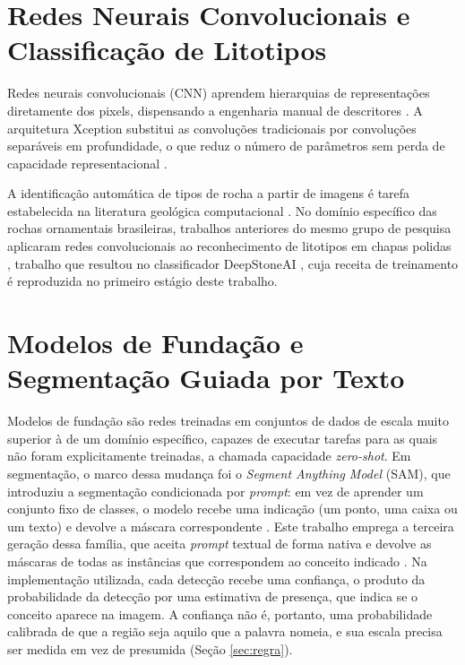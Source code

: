 \section{Redes Neurais Convolucionais e Classificação de Litotipos}

Redes neurais convolucionais (CNN) aprendem hierarquias de representações diretamente dos pixels, dispensando a engenharia manual de descritores \cite{deeplearning_lecun2015}. A arquitetura Xception substitui as convoluções tradicionais por convoluções separáveis em profundidade, o que reduz o número de parâmetros sem perda de capacidade representacional \cite{xception_chollet2017}.

A identificação automática de tipos de rocha a partir de imagens é tarefa estabelecida na literatura geológica computacional \cite{rocktyping_baraboshkin2020}. No domínio específico das rochas ornamentais brasileiras, trabalhos anteriores do mesmo grupo de pesquisa aplicaram redes convolucionais ao reconhecimento de litotipos em chapas polidas \cite{deepstone_araujo2022}, trabalho que resultou no classificador DeepStoneAI \cite{deepstoneai_moreira2025}, cuja receita de treinamento é reproduzida no primeiro estágio deste trabalho.

\section{Modelos de Fundação e Segmentação Guiada por Texto}
\label{sec:fundacao}

Modelos de fundação são redes treinadas em conjuntos de dados de escala muito superior à de um domínio específico, capazes de executar tarefas para as quais não foram explicitamente treinadas, a chamada capacidade \textit{zero-shot}. Em segmentação, o marco dessa mudança foi o \textit{Segment Anything Model} (SAM), que introduziu a segmentação condicionada por \textit{prompt}: em vez de aprender um conjunto fixo de classes, o modelo recebe uma indicação (um ponto, uma caixa ou um texto) e devolve a máscara correspondente \cite{sam_kirillov2023}. Este trabalho emprega a terceira geração dessa família, que aceita \textit{prompt} textual de forma nativa e devolve as máscaras de todas as instâncias que correspondem ao conceito indicado \cite{sam3_carion2026}. Na implementação utilizada, cada detecção recebe uma confiança, o produto da probabilidade da detecção por uma estimativa de presença, que indica se o conceito aparece na imagem. A confiança não é, portanto, uma probabilidade calibrada de que a região seja aquilo que a palavra nomeia, e sua escala precisa ser medida em vez de presumida (Seção \ref{sec:regra}).

